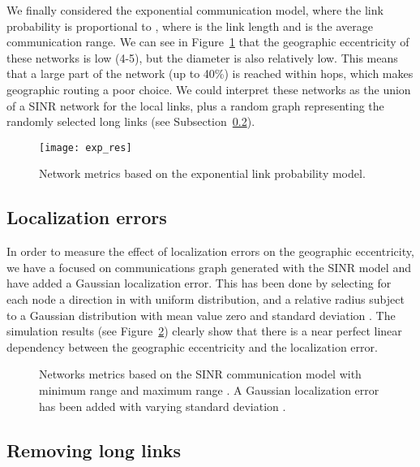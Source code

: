\documentclass{article}
\begin{document}
We finally considered the exponential communication model, where the link probability is proportional to , where  is the link length and  is the average communication range. We can see in Figure~\ref{fig_exp} that the geographic eccentricity of these networks is low (4-5), but the diameter is also relatively low. This means that a large part of the network (up to 40\%) is reached within  hops, which makes geographic routing a poor choice. We could interpret these networks as the union of a SINR network for the local links, plus a random graph representing the randomly selected long links (see Subsection~\ref{sub_trunc}).
\begin{figure}[h]
\begin{center}
\texttt{[image: exp\_res]}
\caption{Network metrics based on the exponential link probability model.}
\label{fig_exp}
\end{center}
\end{figure}

\subsection{Localization errors}
In order to measure the effect of localization errors on the geographic eccentricity, we have a focused on communications graph generated with the SINR model and have added a Gaussian localization error.
 This has been done by selecting for each node a direction in  with uniform distribution, and a relative radius  subject to a Gaussian distribution with mean value zero and standard deviation . The simulation results (see Figure~\ref{fig_sinr_e}) clearly show that there is a near perfect linear dependency between the geographic eccentricity and the localization error.
\begin{figure}[h]
\begin{center}
\caption{Networks metrics based on the SINR communication model with minimum range  and maximum range . A Gaussian localization error has been added with varying standard deviation .}
\label{fig_sinr_e}
\end{center}
\end{figure}

\subsection{Removing long links}
\label{sub_trunc}
\end{document}
